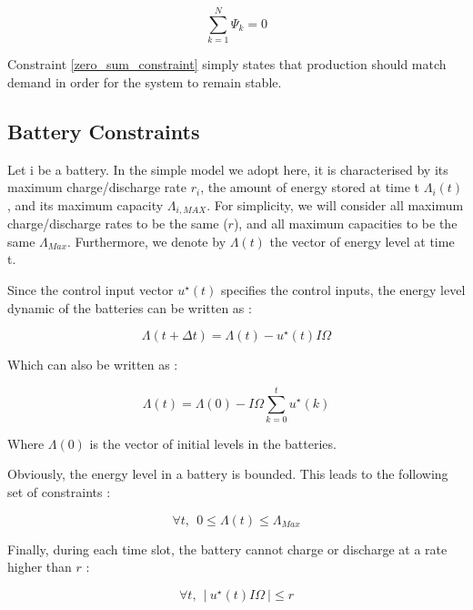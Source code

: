 \documentclass[10pt,twoside%
                ,draft%
        ]{article}
\begin{document}
\begin{equation}
\label{zero_sum_constraint}
\sum_{k=1}^{N} \Psi_k = 0
\end{equation}

Constraint \ref{zero_sum_constraint} simply states that production should match demand in order for the system to remain stable.


\subsection{Battery Constraints}

Let i be a battery. In the simple model we adopt here, it is characterised by its maximum charge/discharge rate $r_i$, the amount of energy stored at time t $ \Lambda_i(t) $, and its maximum capacity $ \Lambda_{i, MAX} $. For simplicity, we will consider all maximum charge/discharge rates to be the same ($r$), and all maximum capacities to be the same $\Lambda_{Max}$. Furthermore, we denote by $ \Lambda(t) $ the vector of energy level at time t.

Since the control input vector $ u^{\star}(t) $ specifies the control inputs, the energy level dynamic of the batteries can be written as :

\begin{equation}
\Lambda(t+\Delta t) = \Lambda(t) - u^{\star}(t) I \Omega 
\end{equation}

Which can also be written as :

\begin{equation}
\Lambda(t)  = \Lambda(0) - I \Omega \sum_{k=0}^{t}u^{\star}(k)
\end{equation}

Where $ \Lambda(0) $ is the vector of initial levels in the batteries.

Obviously, the energy level in a battery is bounded. This leads to the following set of constraints : 

\begin{equation}
\label{level_constraints}
 \forall t, \ \ 0 \leq \Lambda(t) \leq \Lambda_{Max}
\end{equation}
 
Finally, during each time slot, the battery cannot charge or discharge at a rate higher than $ r $ : 

\begin{equation}
\label{rate_constraints}
 \forall t,\ \ \left|\ u^{\star}(t)I \Omega\ \right| \leq r 
 \end{equation}
\end{document}
